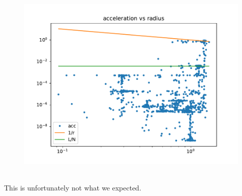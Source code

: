         \newpage
        \begin{figure}[h!]
            \centering
            \includegraphics[width=\textwidth]{../figures/acc2.pdf}
        \end{figure} \ \\ 

        This is unfortunately not what we expected. 

